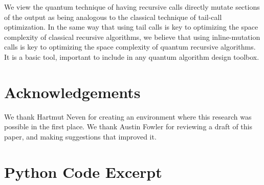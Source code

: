 \documentclass[onecolumn,unpublished]{quantumarticle}
\begin{document}
We view the quantum technique of having recursive calls directly mutate sections of the output as being analogous to the classical technique of tail-call optimization.
In the same way that using tail calls is key to optimizing the space complexity of classical recursive algorithms, we believe that using inline-mutation calls is key to optimizing the space complexity of quantum recursive algorithms.
It is a basic tool, important to include in any quantum algorithm design toolbox.


\section{Acknowledgements}

We thank Hartmut Neven for creating an environment where this research was possible in the first place.
We thank Austin Fowler for reviewing a draft of this paper, and making suggestions that improved it.





\appendix

\section{Python Code Excerpt}
\label{app:python}
\end{document}
